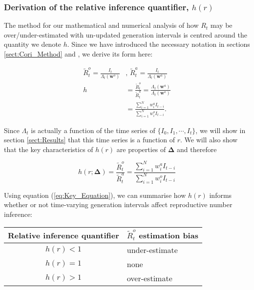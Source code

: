 \documentclass[10pt,journal,compsoc]{IEEEtran}
\begin{document}
\subsubsection{Derivation of the relative inference quantifier, $h(r)$}

The method for our mathematical and numerical analysis of how $R_t$ may be over/under-estimated with un-updated generation intervals is centred around the quantity we denote $h$. Since we have introduced the necessary notation in sections \ref{sect:Cori_Method} and \label{sect:Update_Method}, we derive its form here:

\begin{align*}
    \tilde{R}_t^o = \frac{I_t}{\Lambda_t(\boldsymbol{w}^o)} &\text{, }
    \tilde{R}_t^a = \frac{I_t}{\Lambda_t(\boldsymbol{w}^a)}\\
    h&= \frac{\tilde{R}_t^o}{\tilde{R}_t^a} = \frac{\Lambda_t(\boldsymbol{w}^a)}{\Lambda_t(\boldsymbol{w}^o)}\\
    &= \frac{\sum_{i=1}^Nw_i^aI_{t-i}}{\sum_{i=1}^Nw_i^oI_{t-i}}.
\end{align*}

Since $\Lambda_t$ is actually a function of the time series of $\{I_0, I_1, \cdots , I_t \}$, we will show in section \ref{sect:Results} that this time series is a function of $r$. We will also show that the key characteristics of $h(r)$ are properties of $\boldsymbol{\Delta}$ and therefore

\begin{mdframed}
\begin{equation}\label{eq:Key_Equation}
   h(r; \boldsymbol{\Delta}) = \frac{\tilde{R}_t^o}{\tilde{R}_t^a} = \frac{\sum_{i=1}^Nw_i^aI_{t-i}}{\sum_{i=1}^Nw_i^oI_{t-i}}
\end{equation}
\end{mdframed}

Using equation (\ref{eq:Key_Equation}), we can summarise how $h(r)$ informs whether or not time-varying generation intervals affect reproductive number inference:\\
\begin{table}[h]
\centering
\begin{tabular}{c l}
Relative inference quantifier & $\tilde{R}_t^o$ estimation bias \\
\hline
$h(r) < 1$ & under-estimate \\
$h(r) = 1$ & none \\
$h(r) > 1$ & over-estimate \\ \hline
\end{tabular}
\label{table:table_2}
\end{table}
\end{document}
